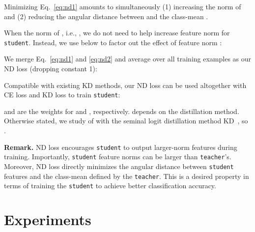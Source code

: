 \documentclass{article}
\begin{document}
Minimizing Eq.~\ref{eq:nd1} amounts to simultaneously (1) increasing the norm of  and (2) reducing the angular distance between  and the class-mean . 



When the norm of , i.e.,  ,
we do not need  to help increase feature norm for {\tt student}.
Instead, we use below to factor out the effect of feature norm :

We merge Eq.~\ref{eq:nd1} and \ref{eq:nd2} and average over all training examples as our ND loss (dropping constant 1):



Compatible with existing KD methods, our ND loss  can be used altogether with CE loss  and KD loss  to train {\tt student}: 

 and  are the weights for  and , respectively.
 depends on the distillation method.
Otherwise stated, we study of  with the seminal logit distillation method KD~\cite{hinton2015distilling}, so . 


{\bf Remark.}
ND loss encourages {\tt student} to output larger-norm features during training. Importantly, {\tt student} feature norms can be larger than {\tt teacher}'s.
Moreover, ND loss directly minimizes the angular distance between {\tt student} features and the class-mean defined by the {\tt teacher}.
This is a desired property in terms of training the {\tt student} to achieve better classification accuracy.






 






\section{Experiments}
\end{document}
